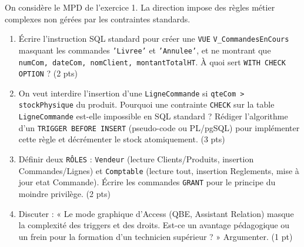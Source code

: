 \documentclass[11pt]{article}
\begin{document}
\begin{exercice}
On considère le MPD de l'exercice 1. La direction impose des règles métier complexes non gérées par les contraintes standards.
\begin{enumerate}
    \item Écrire l'instruction SQL standard pour créer une \texttt{VUE} \texttt{V\_CommandesEnCours} masquant les commandes \texttt{'Livree'} et \texttt{'Annulee'}, et ne montrant que \texttt{numCom, dateCom, nomClient, montantTotalHT}. À quoi sert \texttt{WITH CHECK OPTION} ? (2 pts)
    \item On veut interdire l'insertion d'une \texttt{LigneCommande} si \texttt{qteCom > stockPhysique} du produit. Pourquoi une contrainte \texttt{CHECK} sur la table \texttt{LigneCommande} est-elle impossible en SQL standard ? Rédiger l'algorithme d'un \texttt{TRIGGER BEFORE INSERT} (pseudo-code ou PL/pgSQL) pour implémenter cette règle et décrémenter le stock atomiquement. (3 pts)
    \item Définir deux \texttt{RÔLES} : \texttt{Vendeur} (lecture Clients/Produits, insertion Commandes/Lignes) et \texttt{Comptable} (lecture tout, insertion Reglements, mise à jour etat Commande). Écrire les commandes \texttt{GRANT} pour le principe du moindre privilège. (2 pts)
    \item Discuter : « Le mode graphique d'Access (QBE, Assistant Relation) masque la complexité des triggers et des droits. Est-ce un avantage pédagogique ou un frein pour la formation d'un technicien supérieur ? » Argumenter. (1 pt)
\end{enumerate}
\end{exercice}
\end{document}
